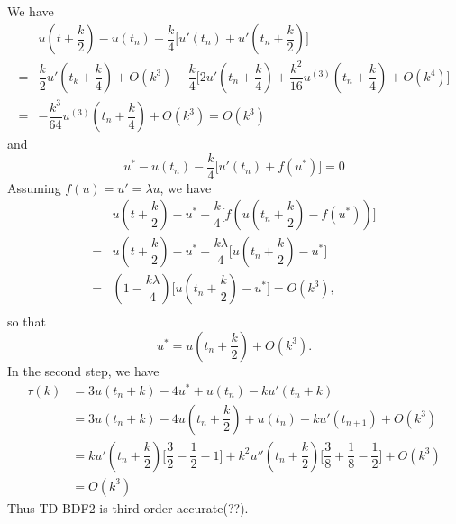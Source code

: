 \documentclass[11pt]{article}
\begin{document}
\subsection{}
We have
\begin{equation}\begin{split}
    &u(t+\dfrac k2)-u(t_n)-\dfrac k4\big[u'(t_n)+u'(t_n+\dfrac k2)\big]\\
    =&\dfrac k2u'(t_k+\dfrac k4)+O(k^3)-\dfrac k4\big[2u'(t_n+\dfrac k4)+\dfrac{k^2}{16}u^{(3)}(t_n+\dfrac k4)+O(k^4)\big]\\
    =&-\dfrac{k^3}{64}u^{(3)}(t_n+\dfrac k4) + O(k^3) = O(k^3)
\end{split}\end{equation} 
and
\begin{equation}
    u^*-u(t_n)-\dfrac k4\big[u'(t_n)+f(u^*)\big] = 0
\end{equation}
Assuming $f(u)=u'=\lambda u$, we have
\begin{equation}\begin{split}
    &u(t+\dfrac k2) - u^* -\dfrac k4\big[f(u(t_n+\dfrac k2)-f(u^*))\big]\\
    =&u(t+\dfrac k2)-u^*-\dfrac{k\lambda}4\big[u(t_n+\dfrac k2)-u^*\big]\\
    =&(1-\dfrac{k\lambda}4)\big[u(t_n+\dfrac k2)-u^*\big]=O(k^3),\\
\end{split}\nonumber\end{equation}
so that
\begin{equation}
    u^* = u(t_n+\dfrac k2) + O(k^3).
\end{equation} 
In the second step, we have 
\begin{equation}\begin{split}
    \tau(k) &= 3u(t_n+k)-4u^*+u(t_n)-ku'(t_n+k)\\
            &= 3u(t_n+k)-4u(t_n+\dfrac k2)+u(t_n)-ku'(t_{n+1}) + O(k^3)\\
            &=ku'(t_n+\dfrac k2)\big[\dfrac32-\dfrac12-1\big] +
                k^2u''(t_n+\dfrac k2)\big[\dfrac38+\dfrac18-\dfrac12\big]+O(k^3)\\
            &=O(k^3)
\end{split}\end{equation} 
Thus TD-BDF2 is third-order accurate(??).
\end{document}
